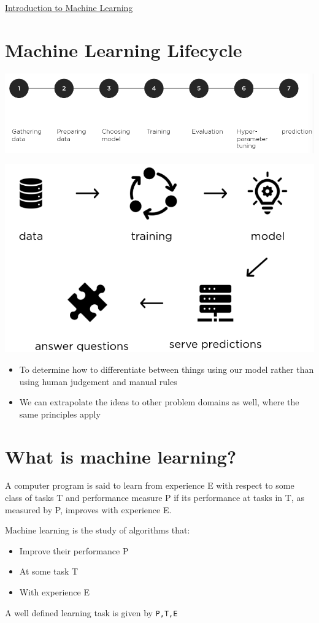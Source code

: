 \documentclass{article}[18pt]
\begin{document}
\begin{center}
\underline{\huge Introduction to Machine Learning}
\end{center}
\section{Machine Learning Lifecycle}
\begin{center}
	\includegraphics[scale=0.7]{"Machine Learning Lifecycle"}
\end{center}
\begin{center}
	\includegraphics[scale=0.7]{"Machine Learning Lifecycle1"}
\end{center}
\begin{itemize}
	\item To determine how to differentiate between things using our model rather than using human judgement and manual rules
	\item We can extrapolate the ideas to other problem domains as well, where the same principles apply
\end{itemize}
\section{What is machine learning?}
\begin{defin}
A computer program is said to learn from experience E with respect to some class of tasks T and performance measure P if its performance at tasks in T, as measured by P, improves with experience E.
\end{defin}
Machine learning is the study of algorithms that:
\begin{itemize}
	\item Improve their performance P
	\item At some task T
	\item With experience E
\end{itemize}
A well defined learning task is given by \texttt{P,T,E}
\end{document}
